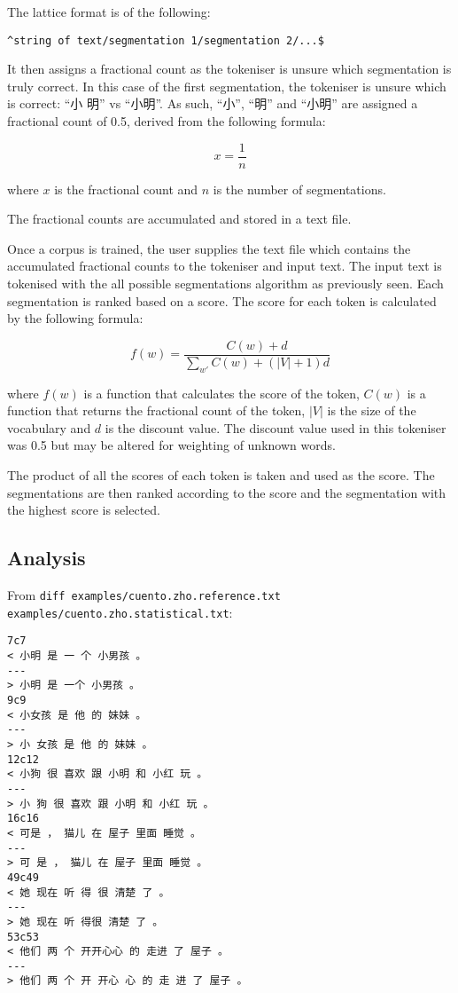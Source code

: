 \documentclass{article}
\begin{document}
The lattice format is of the following:

\begin{verbatim}
^string of text/segmentation 1/segmentation 2/...$
\end{verbatim}

It then assigns a fractional count as the tokeniser is unsure which
segmentation is truly correct. In this case of the first segmentation,
the tokeniser is unsure which is correct: ``小 明'' vs ``小明''. As
such, ``小'', ``明'' and ``小明'' are assigned a fractional count of
0.5, derived from the following formula:

\[x = \frac{1}{n}\]

where $x$ is the fractional count and $n$ is the number of
segmentations.

The fractional counts are accumulated and stored in a text file.

Once a corpus is trained, the user supplies the text file which contains
the accumulated fractional counts to the tokeniser and input text. The
input text is tokenised with the all possible segmentations algorithm as
previously seen. Each segmentation is ranked based on a score. The score
for each token is calculated by the following formula:

\[f(w) = \frac{C(w)+d}{\sum_{w'} C(w) + (\vert V\vert +1)d}\]

where $f(w)$ is a function that calculates the score of the token,
$C(w)$ is a function that returns the fractional count of the token,
$\vert V\vert $ is the size of the vocabulary and $d$ is the discount
value. The discount value used in this tokeniser was 0.5 but may be
altered for weighting of unknown words.

The product of all the scores of each token is taken and used as the
score. The segmentations are then ranked according to the score and the
segmentation with the highest score is selected.

\subsection{Analysis}

From
\texttt{diff examples/cuento.zho.reference.txt examples/cuento.zho.statistical.txt}:

\begin{verbatim}
7c7
< 小明 是 一 个 小男孩 。
---
> 小明 是 一个 小男孩 。
9c9
< 小女孩 是 他 的 妹妹 。
---
> 小 女孩 是 他 的 妹妹 。
12c12
< 小狗 很 喜欢 跟 小明 和 小红 玩 。
---
> 小 狗 很 喜欢 跟 小明 和 小红 玩 。
16c16
< 可是 ， 猫儿 在 屋子 里面 睡觉 。
---
> 可 是 ， 猫儿 在 屋子 里面 睡觉 。
49c49
< 她 现在 听 得 很 清楚 了 。
---
> 她 现在 听 得很 清楚 了 。
53c53
< 他们 两 个 开开心心 的 走进 了 屋子 。
---
> 他们 两 个 开 开心 心 的 走 进 了 屋子 。
\end{verbatim}
\end{document}
